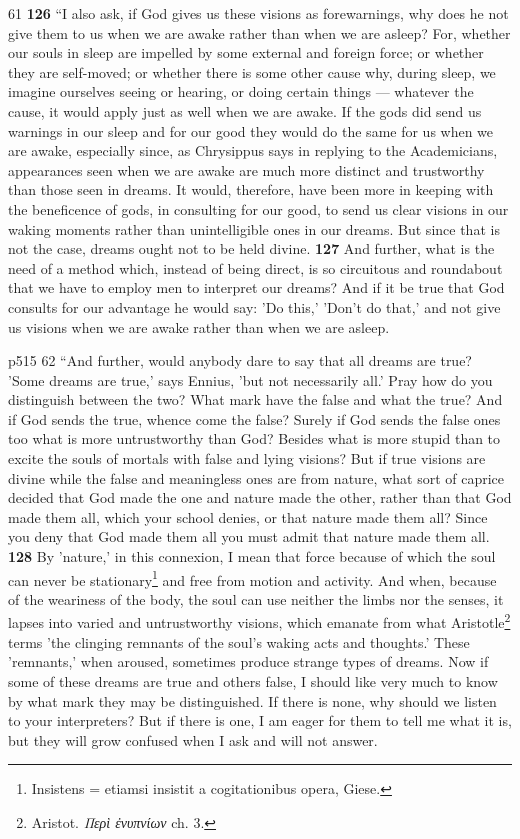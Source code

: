 61
\textbf{126} ``I also ask, if God gives us these visions as forewarnings, why does he not give them to us when we are awake rather than when we are asleep? For, whether our souls in sleep are impelled by some external and foreign force; or whether they are self-moved; or whether there is some other cause why, during sleep, we imagine ourselves seeing or hearing, or doing certain things \texthebrew{—} whatever the cause, it would apply just as well when we are awake. If the gods did send us warnings in our sleep and for our good they would do the same for us when we are awake, especially since, as Chrysippus says in replying to the Academicians, appearances seen when we are awake are much more distinct and trustworthy than those seen in dreams. It would, therefore, have been more in keeping with the beneficence of gods, in consulting for our good, to send us clear visions in our waking moments rather than unintelligible ones in our dreams. But since that is not the case, dreams ought not to be held divine. \textbf{127} And further, what is the need of a method which, instead of being direct, is so circuitous and roundabout that we have to employ men to interpret our dreams? And if it be true that God consults for our advantage he would say: 'Do this,' 'Don't do that,' and not give us visions when we are awake rather than when we are asleep.

p515
62
``And further, would anybody dare to say that all dreams are true? 'Some dreams are true,' says Ennius, 'but not necessarily all.' Pray how do you distinguish between the two? What mark have the false and what the true? And if God sends the true, whence come the false? Surely if God sends the false ones too what is more untrustworthy than God? Besides what is more stupid than to excite the souls of mortals with false and lying visions? But if true visions are divine while the false and meaningless ones are from nature, what sort of caprice decided that God made the one and nature made the other, rather than that God made them all, which your school denies, or that nature made them all? Since you deny that God made them all you must admit that nature made them all. \textbf{128} By 'nature,' in this connexion, I mean that force because of which the soul can never be stationary\texthebrew{}\footnote{Insistens = etiamsi insistit a cogitationibus opera, Giese.

} and free from motion and activity. And when, because of the weariness of the body, the soul can use neither the limbs nor the senses, it lapses into varied and untrustworthy visions, which emanate from what Aristotle\texthebrew{}\footnote{Aristot. \emph{\textgreek{Περ\texthebrew{ὶ ἐ}νυπνίων}} ch. 3.

} terms 'the clinging remnants of the soul's waking acts and thoughts.' These 'remnants,' when aroused, sometimes produce strange types of dreams. Now if some of these dreams are true and others false, I should like very much to know by what mark they may be distinguished. If there is none, why should we listen to your interpreters? But if there is one, I am eager for them to tell me what it is, but they will grow confused when I ask and will not answer.

